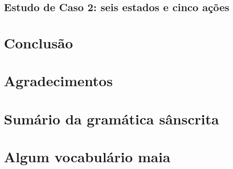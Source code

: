 \documentclass[a4paper]{ifacconf}
\begin{document}
\subsection{Estudo de Caso 2: seis estados e cinco ações}
\section{Conclusão}




\section*{Agradecimentos}


                                                   







\appendix
\section{Sumário da gramática sânscrita}    %
\section{Algum vocabulário maia}              %
\end{document}
